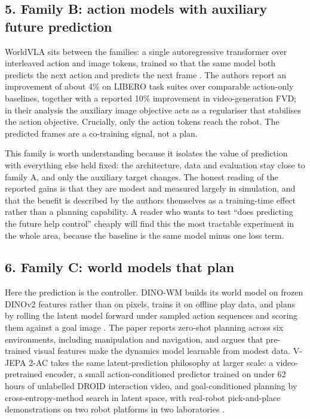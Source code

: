 \documentclass[
  10pt,
  english,
]{article}
\begin{document}
\hypertarget{family-b-action-models-with-auxiliary-future-prediction}{%
\subsection{5. Family B: action models with auxiliary future
prediction}\label{family-b-action-models-with-auxiliary-future-prediction}}

WorldVLA sits between the families: a single autoregressive transformer
over interleaved action and image tokens, trained so that the same model
both predicts the next action and predicts the next frame
\citep{worldvla}. The authors report an improvement of about 4\% on
LIBERO task suites over comparable action-only baselines, together with
a reported 10\% improvement in video-generation FVD; in their analysis
the auxiliary image objective acts as a regulariser that stabilises the
action objective. Crucially, only the action tokens reach the robot. The
predicted frames are a co-training signal, not a plan.

This family is worth understanding because it isolates the value of
prediction with everything else held fixed: the architecture, data and
evaluation stay close to family A, and only the auxiliary target
changes. The honest reading of the reported gains is that they are
modest and measured largely in simulation, and that the benefit is
described by the authors themselves as a training-time effect rather
than a planning capability. A reader who wants to test ``does predicting
the future help control'' cheaply will find this the most tractable
experiment in the whole area, because the baseline is the same model
minus one loss term.

\hypertarget{family-c-world-models-that-plan}{%
\subsection{6. Family C: world models that
plan}\label{family-c-world-models-that-plan}}

Here the prediction is the controller. DINO-WM builds its world model on
frozen DINOv2 features rather than on pixels, trains it on offline play
data, and plans by rolling the latent model forward under sampled action
sequences and scoring them against a goal image \citep{dino_wm}. The
paper reports zero-shot planning across six environments, including
manipulation and navigation, and argues that pre-trained visual features
make the dynamics model learnable from modest data. V-JEPA 2-AC takes
the same latent-prediction philosophy at larger scale: a
video-pretrained encoder, a small action-conditioned predictor trained
on under 62 hours of unlabelled DROID interaction video, and
goal-conditioned planning by cross-entropy-method search in latent
space, with real-robot pick-and-place demonstrations on two robot
platforms in two laboratories \citep{vjepa2}.
\end{document}
